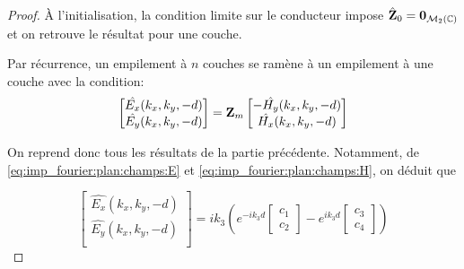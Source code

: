         \begin{proof}
            À l'initialisation, la condition limite sur le conducteur impose \(\hat {\mathbf{Z}}_0 = \mathbf{0}_{\mathcal{M}_2(\mathbb C)}\) et on retrouve le résultat pour une couche.

            Par récurrence, un empilement à \(n\) couches se ramène à un empilement à une couche avec la condition:
            \begin{equation}
                \begin{bmatrix}
                    \hat{E_x}(k_x,k_y,-d)\\
                    \hat{E_y}(k_x,k_y,-d)\\
                \end{bmatrix}
                =
                \mathbf{Z}_m
                \begin{bmatrix}
                    -\hat{H_y}(k_x,k_y,-d)\\
                    \hat{H_x}(k_x,k_y,-d)\\
                \end{bmatrix}
            \end{equation}

            On reprend donc tous les résultats de la partie précédente. Notamment, de \eqref{eq:imp_fourier:plan:champs:E} et \eqref{eq:imp_fourier:plan:champs:H}, on déduit que

            \begin{equation}
                \begin{bmatrix}
                    \hat{E_x}(k_x,k_y,-d)\\
                    \hat{E_y}(k_x,k_y,-d)\\
                \end{bmatrix}
                = ik_3\left( e^{-ik_3 d}
                \begin{bmatrix}
                    c_1 \\
                    c_2
                \end{bmatrix}
                -e^{ik_3 d}
                \begin{bmatrix}
                    c_3 \\
                    c_4
                \end{bmatrix}
                \right)
            \end{equation}


\end{proof}
